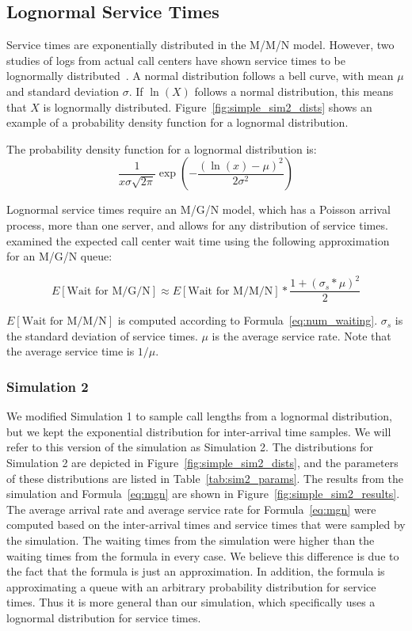 \subsection{Lognormal Service Times}\label{sec:sim_lognormal}

Service times are exponentially distributed in the M/M/N model.
However, two studies of logs from actual call centers have shown service times
to be lognormally distributed~\cite{queue1, queue2}.
A normal distribution follows a bell curve, with mean $\mu$ and standard
deviation $\sigma$.
If $\ln{(X)}$ follows a normal distribution, this means that $X$ is lognormally
distributed.
Figure~\ref{fig:simple_sim2_dists} shows an example of a probability density
function for a lognormal distribution.

The probability density function for a lognormal distribution is:
\[
  \frac{1}{x \sigma \sqrt{2 \pi}}
  \exp{\left( - \frac{\left( \ln(x) - \mu \right)^2}{2 \sigma^2} \right)}
\]

Lognormal service times require an M/G/N model, which has a Poisson arrival
process, more than one server, and allows for any distribution of service times.
\citet{queue1} examined the expected call center wait time using the
following approximation for an M/G/N queue:

\begin{equation}
  E[\text{Wait for M/G/N}] \approx E[\text{Wait for M/M/N}] *
  \frac{1 + (\sigma_s * \mu)^2}{2}
\label{eq:mgn}
\end{equation}

$E[\text{Wait for M/M/N}]$ is computed according to
Formula~\ref{eq:num_waiting}.
$\sigma_s$ is the standard deviation of service times.
$\mu$ is the average service rate.
Note that the average service time is $1/\mu$.

\subsubsection{Simulation 2}

We modified Simulation 1 to sample call lengths from a lognormal
distribution, but we kept the exponential distribution for inter-arrival time
samples.
We will refer to this version of the simulation as Simulation 2.
The distributions for Simulation 2 are depicted in
Figure~\ref{fig:simple_sim2_dists}, and the parameters of these distributions
are listed in Table~\ref{tab:sim2_params}.
The results from the simulation and Formula~\ref{eq:mgn} are shown in
Figure~\ref{fig:simple_sim2_results}.
The average arrival rate and average service rate for Formula~\ref{eq:mgn} were
computed based on the inter-arrival times and service times that were sampled by
the simulation.
The waiting times from the simulation were higher than the waiting times from
the formula in every case.
We believe this difference is due to the fact that the formula is just an
approximation.
In addition, the formula is approximating a queue with an arbitrary probability
distribution for service times.
Thus it is more general than our simulation, which specifically uses a lognormal
distribution for service times.


